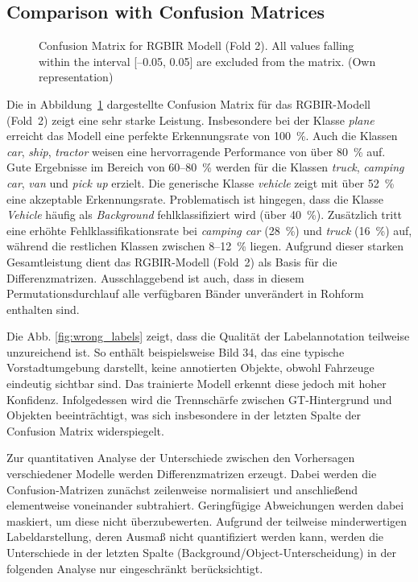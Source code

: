 \FloatBarrier
\subsection{Comparison with Confusion Matrices}
\label{subsec:permexp_comp_confusion_matric}


\begin{figure}[htbp]
    \centering
    
    \caption[Confusion Matrix for RGBIR Modell (Fold 2)]{Confusion Matrix for RGBIR Modell (Fold 2). All values falling within the interval [–0.05, 0.05] are excluded from the matrix. (Own representation)}
    \label{fig:perm_exp_confM_rgbir_f2}
\end{figure}

Die in Abbildung~\ref{fig:perm_exp_confM_rgbir_f2} dargestellte Confusion Matrix für das RGBIR-Modell (Fold~2) zeigt eine sehr starke Leistung. Insbesondere bei der Klasse \textit{plane} erreicht das Modell eine perfekte Erkennungsrate von 100~\%. Auch die Klassen \textit{car}, \textit{ship}, \textit{tractor} weisen eine hervorragende Performance von über 80~\% auf. Gute Ergebnisse im Bereich von 60–80~\% werden für die Klassen \textit{truck}, \textit{camping car}, \textit{van} und \textit{pick up} erzielt. Die generische Klasse \textit{vehicle} zeigt mit über 52~\% eine akzeptable Erkennungsrate. Problematisch ist hingegen, dass die Klasse \textit{Vehicle} häufig als \textit{Background} fehlklassifiziert wird (über 40~\%). Zusätzlich tritt eine erhöhte Fehlklassifikationsrate bei \textit{camping car} (28~\%) und \textit{truck} (16~\%) auf, während die restlichen Klassen zwischen 8–12~\% liegen. Aufgrund dieser starken Gesamtleistung dient das RGBIR-Modell (Fold~2) als Basis für die Differenzmatrizen. Ausschlaggebend ist auch, dass in diesem Permutationsdurchlauf alle verfügbaren Bänder unverändert in Rohform enthalten sind.

Die Abb. \ref{fig:wrong_labels} zeigt, dass die Qualität der Labelannotation teilweise unzureichend ist. So enthält beispielsweise Bild 34, das eine typische Vorstadtumgebung darstellt, keine annotierten Objekte, obwohl Fahrzeuge eindeutig sichtbar sind. Das trainierte Modell erkennt diese jedoch mit hoher Konfidenz. Infolgedessen wird die Trennschärfe zwischen \acrshort{GT}-Hintergrund und Objekten beeinträchtigt, was sich insbesondere in der letzten Spalte der Confusion Matrix widerspiegelt.

Zur quantitativen Analyse der Unterschiede zwischen den Vorhersagen verschiedener Modelle werden Differenzmatrizen erzeugt. Dabei werden die Confusion-Matrizen zunächst zeilenweise normalisiert und anschließend elementweise voneinander subtrahiert. Geringfügige Abweichungen werden dabei maskiert, um diese nicht überzubewerten. Aufgrund der teilweise minderwertigen Labeldarstellung, deren Ausmaß nicht quantifiziert werden kann, werden die Unterschiede in der letzten Spalte (Background/Object-Unterscheidung) in der folgenden Analyse nur eingeschränkt berücksichtigt.


